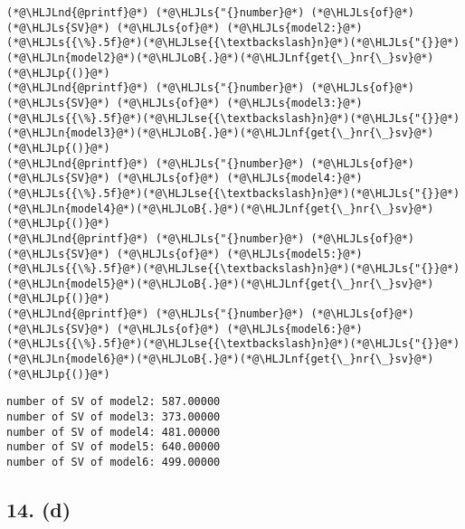 \documentclass[12pt,a4paper]{article}
\newcommand{\HLJLn}[1]{#1}
\newcommand{\HLJLnd}[1]{\textcolor[RGB]{214,102,97}{#1}}
\newcommand{\HLJLnf}[1]{\textcolor[RGB]{66,102,213}{#1}}
\newcommand{\HLJLs}[1]{\textcolor[RGB]{201,61,57}{#1}}
\newcommand{\HLJLse}[1]{\textcolor[RGB]{59,151,46}{#1}}
\newcommand{\HLJLoB}[1]{\textcolor[RGB]{102,102,102}{\textbf{#1}}}
\newcommand{\HLJLp}[1]{#1}
\begin{document}
\begin{lstlisting}
(*@\HLJLnd{@printf}@*) (*@\HLJLs{"{}number}@*) (*@\HLJLs{of}@*) (*@\HLJLs{SV}@*) (*@\HLJLs{of}@*) (*@\HLJLs{model2:}@*) (*@\HLJLs{{\%}.5f}@*)(*@\HLJLse{{\textbackslash}n}@*)(*@\HLJLs{"{}}@*) (*@\HLJLn{model2}@*)(*@\HLJLoB{.}@*)(*@\HLJLnf{get{\_}nr{\_}sv}@*)(*@\HLJLp{()}@*)
(*@\HLJLnd{@printf}@*) (*@\HLJLs{"{}number}@*) (*@\HLJLs{of}@*) (*@\HLJLs{SV}@*) (*@\HLJLs{of}@*) (*@\HLJLs{model3:}@*) (*@\HLJLs{{\%}.5f}@*)(*@\HLJLse{{\textbackslash}n}@*)(*@\HLJLs{"{}}@*) (*@\HLJLn{model3}@*)(*@\HLJLoB{.}@*)(*@\HLJLnf{get{\_}nr{\_}sv}@*)(*@\HLJLp{()}@*)
(*@\HLJLnd{@printf}@*) (*@\HLJLs{"{}number}@*) (*@\HLJLs{of}@*) (*@\HLJLs{SV}@*) (*@\HLJLs{of}@*) (*@\HLJLs{model4:}@*) (*@\HLJLs{{\%}.5f}@*)(*@\HLJLse{{\textbackslash}n}@*)(*@\HLJLs{"{}}@*) (*@\HLJLn{model4}@*)(*@\HLJLoB{.}@*)(*@\HLJLnf{get{\_}nr{\_}sv}@*)(*@\HLJLp{()}@*)
(*@\HLJLnd{@printf}@*) (*@\HLJLs{"{}number}@*) (*@\HLJLs{of}@*) (*@\HLJLs{SV}@*) (*@\HLJLs{of}@*) (*@\HLJLs{model5:}@*) (*@\HLJLs{{\%}.5f}@*)(*@\HLJLse{{\textbackslash}n}@*)(*@\HLJLs{"{}}@*) (*@\HLJLn{model5}@*)(*@\HLJLoB{.}@*)(*@\HLJLnf{get{\_}nr{\_}sv}@*)(*@\HLJLp{()}@*)
(*@\HLJLnd{@printf}@*) (*@\HLJLs{"{}number}@*) (*@\HLJLs{of}@*) (*@\HLJLs{SV}@*) (*@\HLJLs{of}@*) (*@\HLJLs{model6:}@*) (*@\HLJLs{{\%}.5f}@*)(*@\HLJLse{{\textbackslash}n}@*)(*@\HLJLs{"{}}@*) (*@\HLJLn{model6}@*)(*@\HLJLoB{.}@*)(*@\HLJLnf{get{\_}nr{\_}sv}@*)(*@\HLJLp{()}@*)
\end{lstlisting}

\begin{lstlisting}
number of SV of model2: 587.00000
number of SV of model3: 373.00000
number of SV of model4: 481.00000
number of SV of model5: 640.00000
number of SV of model6: 499.00000
\end{lstlisting}


\subsection{14. (d)}
\end{document}
